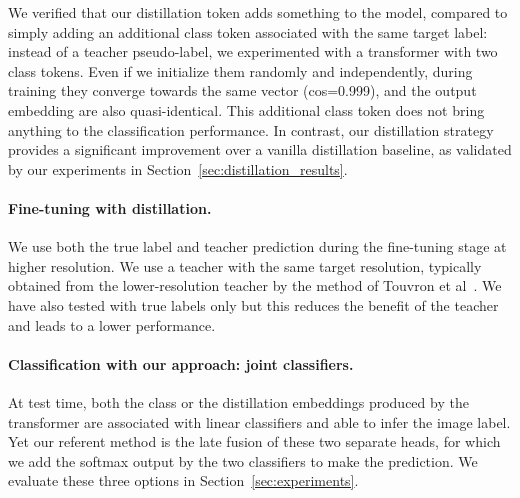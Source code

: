 We verified that our distillation token adds something to the model, compared to simply adding an additional class token associated with the same target label:  instead of a teacher pseudo-label, we experimented with a transformer with two class tokens. Even if we initialize them randomly and independently, during training they converge towards the same vector (cos=0.999), and the output embedding are also quasi-identical.  This additional class token does not bring anything to the classification performance. 
% 
In contrast, our distillation strategy provides a significant improvement over a vanilla distillation baseline, as validated by our experiments in Section~\ref{sec:distillation_results}.  

\paragraph{Fine-tuning with distillation.} 
We use both the true label and teacher prediction during the fine-tuning stage at higher resolution. We use a teacher with the same target resolution, typically obtained from the lower-resolution teacher by the method of Touvron et al~\cite{Touvron2019FixRes}. We have also tested with true labels only but this reduces the benefit of the teacher and leads to a lower performance. 


\paragraph{Classification with our approach: joint classifiers.} 
At test time,  both the class or the distillation embeddings produced by the transformer are associated with linear classifiers and able to infer the image label. Yet our referent method is the late fusion of these two separate heads, for which we add the softmax output by the two classifiers to make the prediction. We evaluate these three options in Section~\ref{sec:experiments}. 
